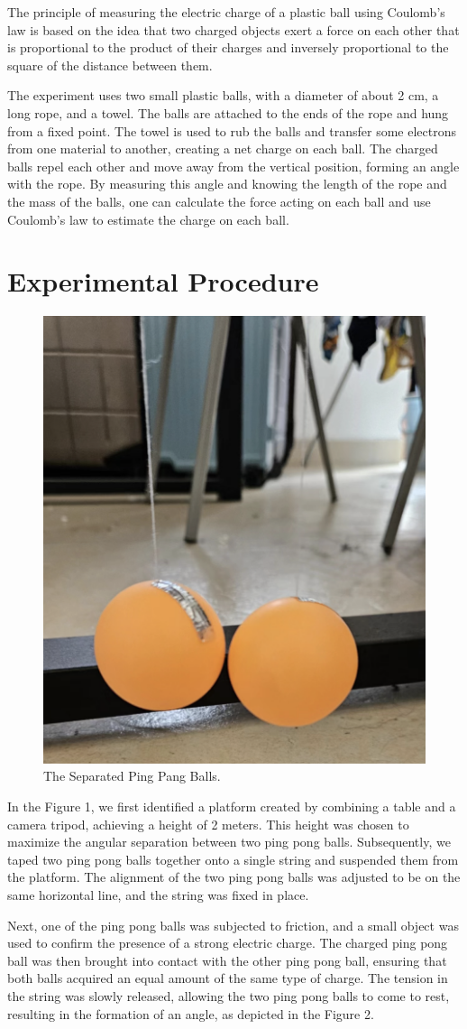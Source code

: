 \documentclass[12pt]{article}
\begin{document}
The principle of measuring the electric charge of a plastic ball using Coulomb's law is based on the idea that two charged objects exert a force on each other that is proportional to the product of their charges and inversely proportional to the square of the distance between them.

The experiment uses two small plastic balls, with a diameter of about 2 cm, a long rope, and a towel. The balls are attached to the ends of the rope and hung from a fixed point. The towel is used to rub the balls and transfer some electrons from one material to another, creating a net charge on each ball. The charged balls repel each other and move away from the vertical position, forming an angle with the rope. By measuring this angle and knowing the length of the rope and the mass of the balls, one can calculate the force acting on each ball and use Coulomb's law to estimate the charge on each ball.


\section{Experimental Procedure}

\begin{figure}[h]
    \centering
    \includegraphics[width=0.4\linewidth]{1.png}
    \caption{The Separated Ping Pang Balls.}
\end{figure}

In the Figure 1, we first identified a platform created by combining a table and a camera tripod, achieving a height of 2 meters. This height was chosen to maximize the angular separation between two ping pong balls. Subsequently, we taped two ping pong balls together onto a single string and suspended them from the platform. The alignment of the two ping pong balls was adjusted to be on the same horizontal line, and the string was fixed in place.

Next, one of the ping pong balls was subjected to friction, and a small object was used to confirm the presence of a strong electric charge. The charged ping pong ball was then brought into contact with the other ping pong ball, ensuring that both balls acquired an equal amount of the same type of charge. The tension in the string was slowly released, allowing the two ping pong balls to come to rest, resulting in the formation of an angle, as depicted in the Figure 2.
\end{document}
